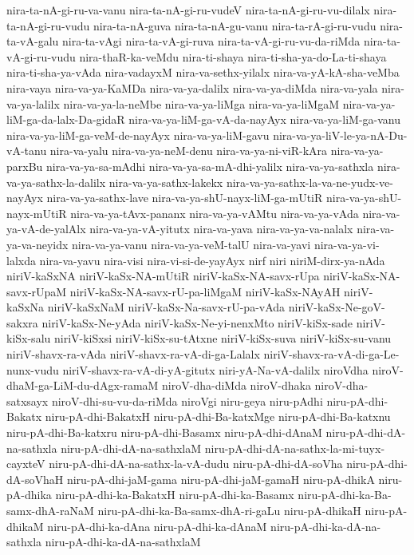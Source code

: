{nira-ta-nA-gi-ru-va-vanu
nira-ta-nA-gi-ru-vudeV
nira-ta-nA-gi-ru-vu-dilalx
nira-ta-nA-gi-ru-vudu
nira-ta-nA-guva
nira-ta-nA-gu-vanu
nira-ta-rA-gi-ru-vudu
nira-ta-vA-galu
nira-ta-vAgi
nira-ta-vA-gi-ruva
nira-ta-vA-gi-ru-vu-da-riMda
nira-ta-vA-gi-ru-vudu
nira-thaR-ka-veMdu
nira-ti-shaya
nira-ti-sha-ya-do-La-ti-shaya
nira-ti-sha-ya-vAda
nira-vadayxM
nira-va-sethx-yilalx
nira-va-yA-kA-sha-veMba
nira-vaya
nira-va-ya-KaMDa
nira-va-ya-dalilx
nira-va-ya-diMda
nira-va-yala
nira-va-ya-lalilx
nira-va-ya-la-neMbe
nira-va-ya-liMga
nira-va-ya-liMgaM
nira-va-ya-liM-ga-da-lalx-Da-gidaR
nira-va-ya-liM-ga-vA-da-nayAyx
nira-va-ya-liM-ga-vanu
nira-va-ya-liM-ga-veM-de-nayAyx
nira-va-ya-liM-gavu
nira-va-ya-liV-le-ya-nA-Du-vA-tanu
nira-va-yalu
nira-va-ya-neM-denu
nira-va-ya-ni-viR-kAra
nira-va-ya-parxBu
nira-va-ya-sa-mAdhi
nira-va-ya-sa-mA-dhi-yalilx
nira-va-ya-sathxla
nira-va-ya-sathx-la-dalilx
nira-va-ya-sathx-lakekx
nira-va-ya-sathx-la-va-ne-yudx-ve-nayAyx
nira-va-ya-sathx-lave
nira-va-ya-shU-nayx-liM-ga-mUtiR
nira-va-ya-shU-nayx-mUtiR
nira-va-ya-tAvx-pananx
nira-va-ya-vAMtu
nira-va-ya-vAda
nira-va-ya-vA-de-yalAlx
nira-va-ya-vA-yitutx
nira-va-yava
nira-va-ya-va-nalalx
nira-va-ya-va-neyidx
nira-va-ya-vanu
nira-va-ya-veM-talU
nira-va-yavi
nira-va-ya-vi-lalxda
nira-va-yavu
nira-visi
nira-vi-si-de-yayAyx
nirf
niri
niriM-dirx-ya-nAda
niriV-kaSxNA
niriV-kaSx-NA-mUtiR
niriV-kaSx-NA-savx-rUpa
niriV-kaSx-NA-savx-rUpaM
niriV-kaSx-NA-savx-rU-pa-liMgaM
niriV-kaSx-NAyAH
niriV-kaSxNa
niriV-kaSxNaM
niriV-kaSx-Na-savx-rU-pa-vAda
niriV-kaSx-Ne-goV-sakxra
niriV-kaSx-Ne-yAda
niriV-kaSx-Ne-yi-nenxMto
niriV-kiSx-sade
niriV-kiSx-salu
niriV-kiSxsi
niriV-kiSx-su-tAtxne
niriV-kiSx-suva
niriV-kiSx-su-vanu
niriV-shavx-ra-vAda
niriV-shavx-ra-vA-di-ga-Lalalx
niriV-shavx-ra-vA-di-ga-Le-nunx-vudu
niriV-shavx-ra-vA-di-yA-gitutx
niri-yA-Na-vA-dalilx
niroVdha
niroV-dhaM-ga-LiM-du-dAgx-ramaM
niroV-dha-diMda
niroV-dhaka
niroV-dha-satxsayx
niroV-dhi-su-vu-da-riMda
niroVgi
niru-geya
niru-pAdhi
niru-pA-dhi-Bakatx
niru-pA-dhi-BakatxH
niru-pA-dhi-Ba-katxMge
niru-pA-dhi-Ba-katxnu
niru-pA-dhi-Ba-katxru
niru-pA-dhi-Basamx
niru-pA-dhi-dAnaM
niru-pA-dhi-dA-na-sathxla
niru-pA-dhi-dA-na-sathxlaM
niru-pA-dhi-dA-na-sathx-la-mi-tuyx-cayxteV
niru-pA-dhi-dA-na-sathx-la-vA-dudu
niru-pA-dhi-dA-soVha
niru-pA-dhi-dA-soVhaH
niru-pA-dhi-jaM-gama
niru-pA-dhi-jaM-gamaH
niru-pA-dhikA
niru-pA-dhika
niru-pA-dhi-ka-BakatxH
niru-pA-dhi-ka-Basamx
niru-pA-dhi-ka-Ba-samx-dhA-raNaM
niru-pA-dhi-ka-Ba-samx-dhA-ri-gaLu
niru-pA-dhikaH
niru-pA-dhikaM
niru-pA-dhi-ka-dAna
niru-pA-dhi-ka-dAnaM
niru-pA-dhi-ka-dA-na-sathxla
niru-pA-dhi-ka-dA-na-sathxlaM
}
